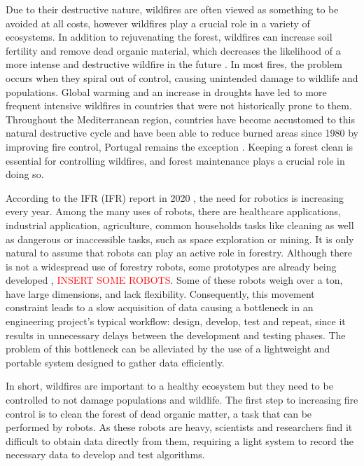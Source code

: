 Due to their destructive nature, wildfires are often viewed as something to be avoided at all costs, however wildfires play a crucial role in a variety of ecosystems. In addition to rejuvenating the forest, wildfires can increase soil fertility and remove dead organic material, which decreases the likelihood of a more intense and destructive wildfire in the future \cite{bond_fires_2017}. In most fires, the problem occurs when they spiral out of control, causing unintended damage to wildlife and populations. Global warming and an increase in droughts have led to more frequent intensive wildfires in countries that were not historically prone to them. Throughout the Mediterranean region, countries have become accustomed to this natural destructive cycle and have been able to reduce burned areas since 1980 by improving fire control, Portugal remains the exception \cite{turco_decreasing_2016}\cite{european_commission_joint_research_centre_forest_2021}. Keeping a forest clean is essential for controlling wildfires, and forest maintenance plays a crucial role in doing so.

According to the \acl{IFR} (\acs{IFR}) report in 2020 \cite{IFR_robot_report_2020}, the need for robotics is increasing every year. Among the many uses of robots, there are healthcare applications, industrial application, agriculture, common households tasks like cleaning as well as dangerous or inaccessible tasks, such as space exploration or mining. It is only natural to assume that robots can play an active role in forestry. Although there is not a widespread use of forestry robots, some prototypes are already being developed \cite{tree_climbing_robot}, \cite{jelavic_towards_2021} \textcolor{red}{INSERT SOME ROBOTS}. Some of these robots weigh over a ton, have large dimensions, and lack flexibility. Consequently, this movement constraint leads to a slow acquisition of data causing a bottleneck in an engineering project's typical workflow: design, develop, test and repeat, since it results in unnecessary delays between the development and testing phases. The problem of this bottleneck can be alleviated by the use of a lightweight and portable system designed to gather data efficiently.

In short, wildfires are important to a healthy ecosystem but they need to be controlled to not damage populations and wildlife. The first step to increasing fire control is to clean the forest of dead organic matter, a task that can be performed by robots. As these robots are heavy, scientists and researchers find it difficult to obtain data directly from them, requiring a light system to record the necessary data to develop and test algorithms.

